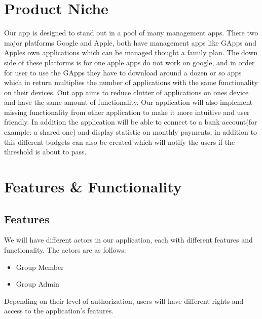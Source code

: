 \documentclass[12pt]{article}
\begin{document}
\pagebreak
\section{Product Niche}
Our app is designed to stand out in a pool of many management apps. There two major platforms Google and Apple, 
both have management apps like GApps and Apples own applications which can be managed thought a family plan. The down side of these
platforms is for one apple apps do not work on google, and in order for user to use the GApps they have to download around a dozen or
so apps which in return multiplies the number of applications with the same functionality on their devices. Out app aims to 
reduce clutter of applications on ones device and have the same amount of functionality. Our application will also implement missing functionality
from other application to make it more intuitive and user friendly. In addition the application will be able
to connect to a bank account(for example: a shared one) and display statistic on monthly payments, in addition to this different budgets 
can also be created which will notify the users if the threshold is about to pass. 

\pagebreak
\section{Features \& Functionality}

\subsection{Features}

We will have different actors in our application, each with different features and functionality. The actors are as follows:

\begin{itemize}
    \item Group Member
    \item Group Admin
\end{itemize}

Depending on their level of authorization, users will have different rights and access to the application's features. 

\setlength{\tabcolsep}{3pt}
\end{document}
